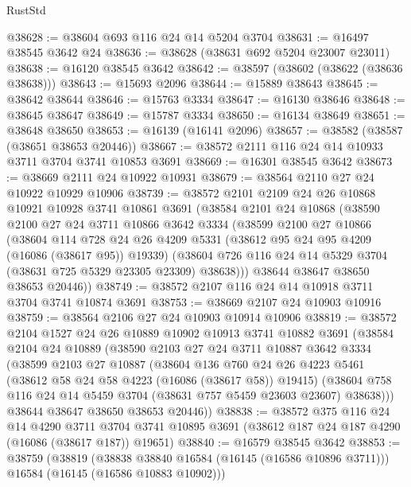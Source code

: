 \begin{lexlean}{RustStd}
\begin{coremodule}
@38628 := @38604 @693 @116 @24 @14 @5204 @3704
@38631 := @16497 @38545 @3642 @24
@38636 := @38628 (@38631 @692 @5204 @23007 @23011)
@38638 := @16120 @38545 @3642
@38642 := @38597 (@38602 (@38622 (@38636 @38638)))
@38643 := @15693 @2096
@38644 := @15889 @38643
@38645 := @38642 @38644
@38646 := @15763 @3334
@38647 := @16130 @38646
@38648 := @38645 @38647
@38649 := @15787 @3334
@38650 := @16134 @38649
@38651 := @38648 @38650
@38653 := @16139 (@16141 @2096)
@38657 := @38582 (@38587 (@38651 @38653 @20446))
@38667 := @38572 @2111 @116 @24 @14 @10933 @3711 @3704 @3741 @10853 @3691
@38669 := @16301 @38545 @3642
@38673 := @38669 @2111 @24 @10922 @10931
@38679 := @38564 @2110 @27 @24 @10922 @10929 @10906
@38739 := @38572
    @2101
    @2109
    @24
    @26
    @10868
    @10921
    @10928
    @3741
    @10861
    @3691
    (@38584
      @2101
      @24
      @10868
      (@38590
        @2100
        @27
        @24
        @3711
        @10866
        @3642
        @3334
        (@38599
          @2100
          @27
          @10866
          (@38604
            @114
            @728
            @24
            @26
            @4209
            @5331
            (@38612 @95 @24 @95 @4209 (@16086 (@38617 @95)) @19339)
            (@38604 @726 @116 @24 @14 @5329 @3704 (@38631 @725 @5329 @23305 @23309) @38638)))
        @38644
        @38647
        @38650
        @38653
        @20446))
@38749 := @38572 @2107 @116 @24 @14 @10918 @3711 @3704 @3741 @10874 @3691
@38753 := @38669 @2107 @24 @10903 @10916
@38759 := @38564 @2106 @27 @24 @10903 @10914 @10906
@38819 := @38572
    @2104
    @1527
    @24
    @26
    @10889
    @10902
    @10913
    @3741
    @10882
    @3691
    (@38584
      @2104
      @24
      @10889
      (@38590
        @2103
        @27
        @24
        @3711
        @10887
        @3642
        @3334
        (@38599
          @2103
          @27
          @10887
          (@38604
            @136
            @760
            @24
            @26
            @4223
            @5461
            (@38612 @58 @24 @58 @4223 (@16086 (@38617 @58)) @19415)
            (@38604 @758 @116 @24 @14 @5459 @3704 (@38631 @757 @5459 @23603 @23607) @38638)))
        @38644
        @38647
        @38650
        @38653
        @20446))
@38838 := @38572
    @375
    @116
    @24
    @14
    @4290
    @3711
    @3704
    @3741
    @10895
    @3691
    (@38612 @187 @24 @187 @4290 (@16086 (@38617 @187)) @19651)
@38840 := @16579 @38545 @3642
@38853 := @38759
    (@38819
      (@38838 @38840 @16584 (@16145 (@16586 @10896 @3711)))
      @16584
      (@16145 (@16586 @10883 @10902)))

\end{coremodule}
\end{lexlean}
